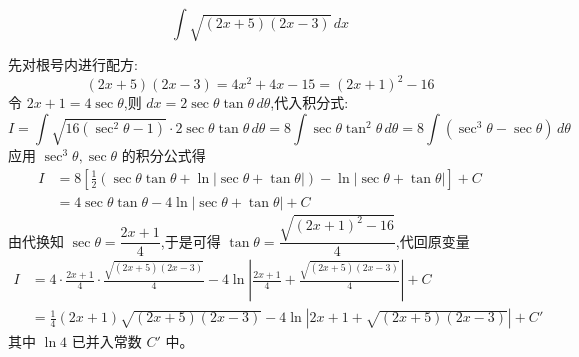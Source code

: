 \begin{questions}
    \question
    \[
    \int \sqrt{(2x+5)(2x-3)} \, dx
    \]
    \begin{solution}
        先对根号内进行配方:
        \[
        (2x+5)(2x-3) = 4x^2+4x-15 = (2x+1)^2-16
        \]
        令 $2x+1 = 4\sec\theta$,则 $dx = 2\sec\theta\tan\theta \, d\theta$,代入积分式:
        \[
        I = \int \sqrt{16(\sec^2\theta-1)} \cdot 2\sec\theta\tan\theta \, d\theta = 8 \int \sec\theta\tan^2\theta \, d\theta = 8 \int (\sec^3\theta - \sec\theta) \, d\theta
        \]
        应用 $\sec^3\theta,\sec\theta$ 的积分公式得
        \begin{align*}
        I &= 8 \left[ \frac{1}{2}(\sec\theta\tan\theta + \ln|\sec\theta+\tan\theta|) - \ln|\sec\theta+\tan\theta| \right] + C \\
        &= 4\sec\theta\tan\theta - 4\ln|\sec\theta+\tan\theta| + C
        \end{align*}
        由代换知 $\sec\theta = \dfrac{2x+1}{4}$,于是可得 $\tan\theta = \dfrac{\sqrt{(2x+1)^2-16}}{4}$,代回原变量
        \begin{align*}
        I &= 4 \cdot \frac{2x+1}{4} \cdot \frac{\sqrt{(2x+5)(2x-3)}}{4} - 4\ln\left| \frac{2x+1}{4} + \frac{\sqrt{(2x+5)(2x-3)}}{4} \right| + C \\
        &= \frac{1}{4}(2x+1)\sqrt{(2x+5)(2x-3)} - 4\ln\left| 2x+1 + \sqrt{(2x+5)(2x-3)} \right| + C'
        \end{align*}
        其中 $\ln 4$ 已并入常数 $C'$ 中。
    \end{solution}


\end{questions}
